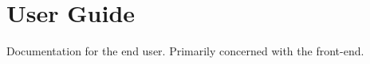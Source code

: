 \documentclass[a4paper,oneside]{alpenthesis/alpenthesis}
\begin{document}
\part{User Guide} 
\label{part:User_Guide}
Documentation  for the  end user. Primarily  concerned with  the 
front-end.



\cleardoublepage %
\begin{titlingpage*}
    \begin{vplace}
        \flushright\Huge\bfseries\sffamily\appendixpagename
    \end{vplace}
\end{titlingpage*}
\appendix
{}







\cleardoublepage %
\backmatter


\printindex
\end{document}
